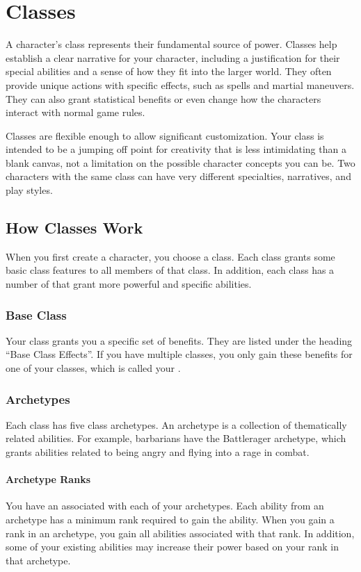\chapter{Classes}\label{Classes}

A character's class represents their fundamental source of power.
Classes help establish a clear narrative for your character, including a justification for their special abilities and a sense of how they fit into the larger world.
They often provide unique actions with specific effects, such as spells and martial maneuvers.
They can also grant statistical benefits or even change how the characters interact with normal game rules.

Classes are flexible enough to allow significant customization.
Your class is intended to be a jumping off point for creativity that is less intimidating than a blank canvas, not a limitation on the possible character concepts you can be.
Two characters with the same class can have very different specialties, narratives, and play styles.

\section{How Classes Work}
  When you first create a character, you choose a class.
  Each class grants some basic class features to all members of that class.
  In addition, each class has a number of  that grant more powerful and specific abilities.

  \subsection{Base Class}\label{Base Class}
    Your class grants you a specific set of benefits.
    They are listed under the heading ``Base Class Effects''.
    If you have multiple classes, you only gain these benefits for one of your classes, which is called your .

  \subsection{Archetypes}\label{Archetypes}
    Each class has five class archetypes.
    An archetype is a collection of thematically related abilities.
    For example, barbarians have the Battlerager archetype, which grants abilities related to being angry and flying into a rage in combat.

    \subsubsection{Archetype Ranks}\label{Archetype Ranks}
      You have an  associated with each of your archetypes.
      Each ability from an archetype has a minimum rank required to gain the ability.
      When you gain a rank in an archetype, you gain all abilities associated with that rank.
      In addition, some of your existing abilities may increase their power based on your rank in that archetype.

